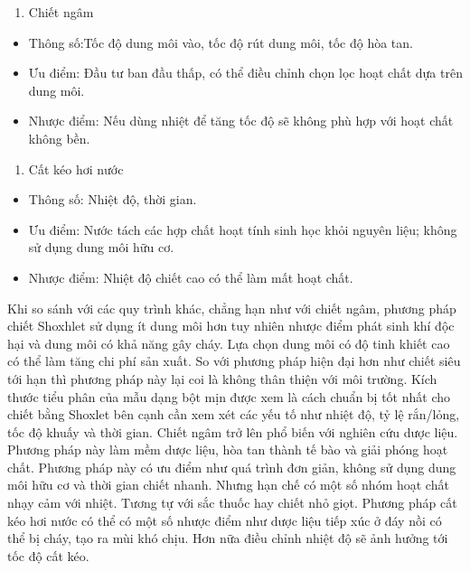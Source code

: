 \documentclass[
  twocolumn,
  landscape]{report}
\providecommand{\tightlist}{%
  \setlength{\itemsep}{0pt}\setlength{\parskip}{0pt}}\usepackage{longtable,booktabs,array}
\begin{document}
\begin{enumerate}
\def\labelenumi{\arabic{enumi}.}
\setcounter{enumi}{1}
\tightlist
\item
  Chiết ngâm
\end{enumerate}

\begin{itemize}
\tightlist
\item
  Thông số:Tốc độ dung môi vào, tốc độ rút dung môi, tốc độ hòa tan.
\item
  Ưu điểm: Đầu tư ban đầu thấp, có thể điều chỉnh chọn lọc hoạt chất dựa
  trên dung môi.
\item
  Nhược điểm: Nếu dùng nhiệt để tăng tốc độ sẽ không phù hợp với hoạt
  chất không bền.
\end{itemize}

\begin{enumerate}
\def\labelenumi{\arabic{enumi}.}
\setcounter{enumi}{2}
\tightlist
\item
  Cất kéo hơi nước
\end{enumerate}

\begin{itemize}
\tightlist
\item
  Thông số: Nhiệt độ, thời gian.
\item
  Ưu điểm: Nước tách các hợp chất hoạt tính sinh học khỏi nguyên liệu;
  không sử dụng dung môi hữu cơ.
\item
  Nhược điểm: Nhiệt độ chiết cao có thể làm mất hoạt chất.
\end{itemize}

Khi so sánh với các quy trình khác, chẳng hạn như với chiết ngâm, phương
pháp chiết Shoxhlet sử dụng ít dung môi hơn tuy nhiên nhược điểm phát
sinh khí độc hại và dung môi có khả năng gây cháy. Lựa chọn dung môi có
độ tinh khiết cao có thể làm tăng chi phí sản xuất. So với phương pháp
hiện đại hơn như chiết siêu tới hạn thì phương pháp này lại coi là không
thân thiện với môi trường. Kích thước tiểu phân của mẫu dạng bột mịn
được xem là cách chuẩn bị tốt nhất cho chiết bằng Shoxlet bên cạnh cần
xem xét các yếu tố như nhiệt độ, tỷ lệ rắn/lỏng, tốc độ khuấy và thời
gian. Chiết ngâm trở lên phổ biến với nghiên cứu dược liệu. Phương pháp
này làm mềm dược liệu, hòa tan thành tế bào và giải phóng hoạt chất.
Phương pháp này có ưu điểm như quá trình đơn giản, không sử dụng dung
môi hữu cơ và thời gian chiết nhanh. Nhưng hạn chế có một số nhóm hoạt
chất nhạy cảm với nhiệt. Tương tự với sắc thuốc hay chiết nhỏ giọt.
Phương pháp cất kéo hơi nước có thể có một số nhược điểm như dược liệu
tiếp xúc ở đáy nồi có thể bị cháy, tạo ra mùi khó chịu. Hơn nữa điều
chỉnh nhiệt độ sẽ ảnh hưởng tới tốc độ cất kéo.
\end{document}
